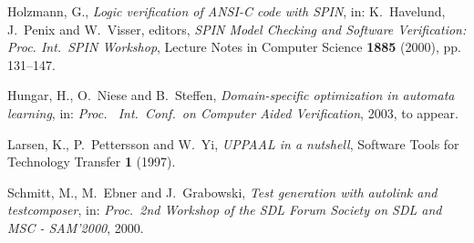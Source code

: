 \begin{thebibliography}{10}
Holzmann, G., \emph{Logic verification of {ANSI-C} code with {SPIN}}, in:
  K.~Havelund, J.~Penix and W.~Visser, editors, \emph{{SPIN} Model Checking and
  Software Verification: Proc.  Int.\ {SPIN} Workshop},  Lecture Notes
  in Computer Science  \textbf{1885} (2000), pp. 131--147.

Hungar, H., O.~Niese and B.~Steffen, \emph{Domain-specific optimization in
  automata learning}, in: \emph{Proc.\  Int.\ Conf.\ on Computer Aided
  Verification}, 2003, to appear.

Larsen, K., P.~Pettersson and W.~Yi, \emph{{UPPAAL} in a nutshell}, Software
  Tools for Technology Transfer \textbf{1} (1997).

Schmitt, M., M.~Ebner and J.~Grabowski, \emph{Test generation with autolink and
  testcomposer}, in: \emph{Proc.\ 2nd Workshop of the SDL Forum Society on SDL
  and MSC - SAM'2000}, 2000.

\end{thebibliography}
